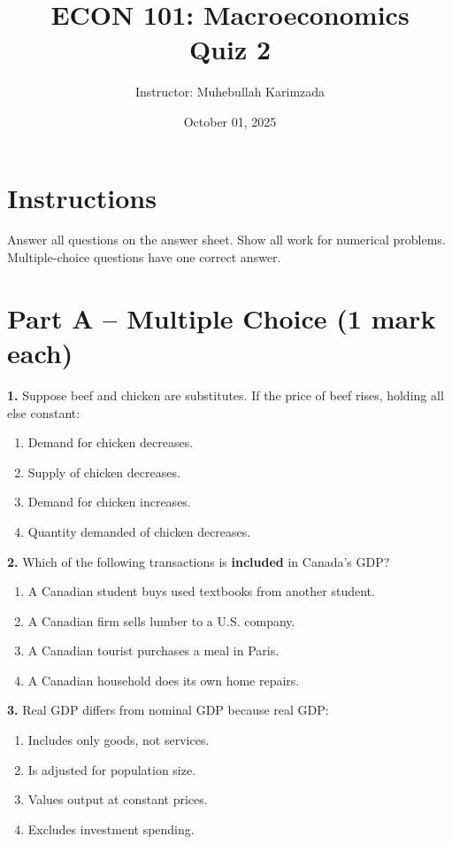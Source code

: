 \documentclass[11pt]{article}
\title{ECON 101: Macroeconomics \\ Quiz 2}
\author{Instructor: Muhebullah Karimzada}
\date{October 01,  2025}
\begin{document}
\maketitle



\section*{Instructions}
Answer all questions on the answer sheet.  Show all work for numerical problems. Multiple-choice questions have one correct answer.


\section*{Part A – Multiple Choice (1 mark each)}

\textbf{1.} Suppose beef and chicken are substitutes. If the price of beef rises, holding all else constant:  
\begin{enumerate}[label=\alph*)]
    \item Demand for chicken decreases.  
    \item Supply of chicken decreases.  
    \item Demand for chicken increases.  
    \item Quantity demanded of chicken decreases.  
\end{enumerate}

\bigskip

\textbf{2.} Which of the following transactions is \textbf{included} in Canada’s GDP?  
\begin{enumerate}[label=\alph*)]
    \item A Canadian student buys used textbooks from another student.  
    \item A Canadian firm sells lumber to a U.S. company.  
    \item A Canadian tourist purchases a meal in Paris.  
    \item A Canadian household does its own home repairs.  
\end{enumerate}

\bigskip

\textbf{3.} Real GDP differs from nominal GDP because real GDP:  
\begin{enumerate}[label=\alph*)]
    \item Includes only goods, not services.  
    \item Is adjusted for population size.  
    \item Values output at constant prices.  
    \item Excludes investment spending.  
\end{enumerate}
\end{document}
